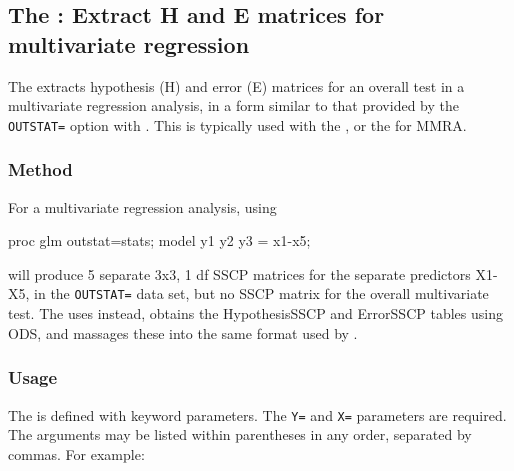 
\subsection{The : Extract H and E matrices for multivariate regression}\label{mac:hemreg}

The  extracts hypothesis (H) and error (E) matrices for an
overall test in a multivariate regression analysis, in a form similar to
that provided by the \texttt{OUTSTAT=} option with .  This is typically
used with the , or the  for MMRA.

\subsubsection*{Method}

For a multivariate regression analysis, using

\begin{listing}
 proc glm outstat=stats;
    model y1 y2 y3 = x1-x5;
\end{listing}

 will produce 5 separate 3x3, 1 df SSCP matrices for the separate
predictors X1-X5, in the \texttt{OUTSTAT=} data set, but no SSCP matrix for
the overall multivariate test. The  uses  instead,
obtains the HypothesisSSCP and ErrorSSCP tables using ODS, and massages
these into the same format used by .

\subsubsection*{Usage}

The  is defined with keyword parameters.  The \texttt{Y=} and
\texttt{X=} parameters are required.
The arguments may be listed within parentheses in any order, separated
by commas. For example:

\begin{listing}
\end{listing}
